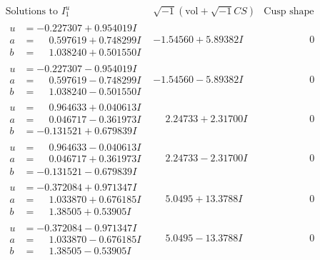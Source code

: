 \documentclass[1p]{elsarticle_modified}
\theoremstyle{definition}
\newcommand{\I}{\sqrt{-1}}
\begin{document}
$$\begin{array}{c|c|c}  
\text{Solutions to }I^u_{1}& \I (\text{vol} + \sqrt{-1}CS) & \text{Cusp shape}\\
 \hline 
\begin{aligned}
u &= -0.227307 + 0.954019 I \\
a &= \phantom{-}0.597619 + 0.748299 I \\
b &= \phantom{-}1.038240 + 0.501550 I\end{aligned}
 & -1.54560 + 5.89382 I & \phantom{-0.000000 } 0 \\ \hline\begin{aligned}
u &= -0.227307 - 0.954019 I \\
a &= \phantom{-}0.597619 - 0.748299 I \\
b &= \phantom{-}1.038240 - 0.501550 I\end{aligned}
 & -1.54560 - 5.89382 I & \phantom{-0.000000 } 0 \\ \hline\begin{aligned}
u &= \phantom{-}0.964633 + 0.040613 I \\
a &= \phantom{-}0.046717 - 0.361973 I \\
b &= -0.131521 + 0.679839 I\end{aligned}
 & \phantom{-}2.24733 + 2.31700 I & \phantom{-0.000000 } 0 \\ \hline\begin{aligned}
u &= \phantom{-}0.964633 - 0.040613 I \\
a &= \phantom{-}0.046717 + 0.361973 I \\
b &= -0.131521 - 0.679839 I\end{aligned}
 & \phantom{-}2.24733 - 2.31700 I & \phantom{-0.000000 } 0 \\ \hline\begin{aligned}
u &= -0.372084 + 0.971347 I \\
a &= \phantom{-}1.033870 + 0.676185 I \\
b &= \phantom{-}1.38505 + 0.53905 I\end{aligned}
 & \phantom{-}5.0495 + 13.3788 I & \phantom{-0.000000 } 0 \\ \hline\begin{aligned}
u &= -0.372084 - 0.971347 I \\
a &= \phantom{-}1.033870 - 0.676185 I \\
b &= \phantom{-}1.38505 - 0.53905 I\end{aligned}
 & \phantom{-}5.0495 - 13.3788 I & \phantom{-0.000000 } 0 \\ \hline\begin{aligned}

\end{aligned}
\end{array}$$
\end{document}
